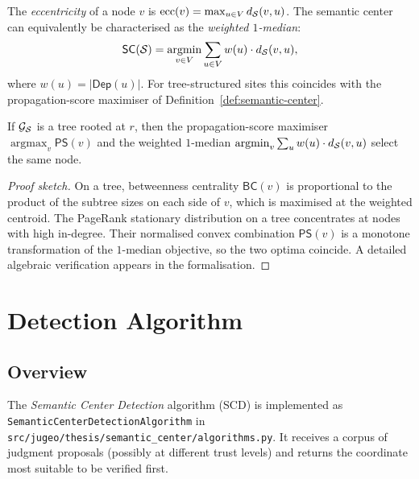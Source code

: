 \documentclass[11pt]{article}
\newcommand{\SC}{\mathsf{SC}}               %
\newcommand{\MG}{\mathcal{G}_{\Site}}       %
\newcommand{\BC}{\mathsf{BC}}               %
\newcommand{\PropScore}{\mathsf{PS}}        %
\newcommand{\DepSet}{\mathsf{Dep}}          %
\newcommand{\SCD}{\textsc{SCD}}             %
\newcommand{\wt}{w}                         %
\begin{document}
\begin{definition}%
\label{def:eccentricity}
The \emph{eccentricity} of a node $v$ is
$\mathrm{ecc}(v) = \max_{u \in V} d_{\mathcal{S}}(v, u)$.
The semantic center can equivalently be characterised as the
\emph{weighted $1$-median}:
\[
  \SC(\Site) = \operatorname*{argmin}_{v \in V}
  \sum_{u \in V} \wt(u) \cdot d_{\Site}(v, u),
\]
where $\wt(u) = |\DepSet(u)|$.  For tree-structured sites this
coincides with the propagation-score maximiser of
Definition~\ref{def:semantic-center}.
\end{definition}

\begin{proposition}\label{prop:equiv-tree}
If $\MG$ is a tree rooted at $r$, then the propagation-score maximiser
$\operatorname{argmax}_v \PropScore(v)$ and the weighted $1$-median
$\operatorname{argmin}_v \sum_u \wt(u) \cdot d_{\Site}(v,u)$ select the
same node.
\end{proposition}
\begin{proof}[Proof sketch]
On a tree, betweenness centrality $\BC(v)$ is proportional to the
product of the subtree sizes on each side of $v$, which is maximised at
the weighted centroid.  The PageRank stationary distribution on a tree
concentrates at nodes with high in-degree.  Their normalised convex
combination $\PropScore(v)$ is a monotone transformation of the
$1$-median objective, so the two optima coincide.  A detailed algebraic
verification appears in the \LEAN{} formalisation.
\end{proof}

\section{Detection Algorithm}\label{sec:detection}

\subsection{Overview}

The \emph{Semantic Center Detection} algorithm (\SCD{}) is implemented
as \texttt{SemanticCenterDetectionAlgorithm} in
\texttt{src/jugeo/thesis/semantic\_center/algorithms.py}.
It receives a corpus of judgment proposals (possibly at different trust
levels) and returns the coordinate most suitable to be verified first.
\end{document}
